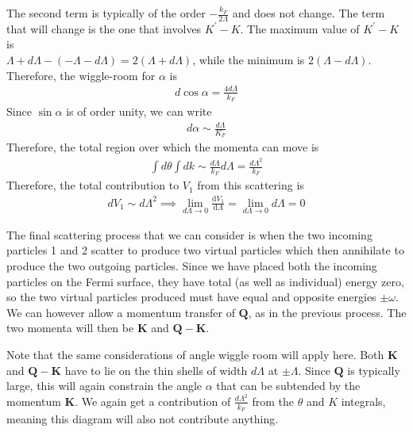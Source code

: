 \documentclass[14pt]{extarticle}
\begin{document}
The second term is typically of the order \(-\frac{k_F}{2\Lambda}\) and does not change. The term that will change is the one that involves \(K^\prime - K\). The maximum value of \(K^\prime - K\) is \\\(\Lambda + d\Lambda  - \left(-\Lambda - d\Lambda\right) = 2\left(\Lambda+d\Lambda\right)\), while the minimum is
\(2\left(\Lambda-d\Lambda\right)\). Therefore, the wiggle-room for \(\alpha\) is
\begin{equation}\begin{aligned}
d\cos \alpha = \frac{4 d\Lambda}{k_F}
\end{aligned}\end{equation}
Since \(\sin \alpha\) is of order unity, we can write
\begin{equation}\begin{aligned}
d\alpha \sim \frac{d\Lambda}{K_F}
\end{aligned}\end{equation}
Therefore, the total region over which the momenta can move is
\begin{equation}\begin{aligned}
\int d\theta \int dk \sim \frac{d\Lambda}{k_F}d\Lambda = \frac{d\Lambda^2}{k_F}
\end{aligned}\end{equation}
Therefore, the total contribution to \(V_1\) from this scattering is
\begin{equation}\begin{aligned}
	d V_1 \sim d\Lambda^2 \implies \lim_{d\Lambda \to 0} \frac{\mathrm{d}V_1}{\mathrm{d}\Lambda} = \lim_{d\Lambda \to 0} d\Lambda = 0
\end{aligned}\end{equation}
\begin{minipage}{280pt}
	The final scattering process that we can consider is when the two incoming particles 1 and 2 scatter to produce two virtual particles which then annihilate to produce the two outgoing particles. Since we have placed both the incoming particles on the Fermi surface, they have total (as well as individual) energy zero, so the two virtual particles produced must have equal and opposite energies \(\pm \omega\). We can however allow a momentum transfer of \(\mathbf{Q}\), as in the previous process. The two momenta will then be \(\mathbf{K}\) and \(\mathbf{Q} -\mathbf{K}\).
 
Note that the same considerations of angle wiggle room will apply here. Both \(\mathbf{K}\) and \(\mathbf{Q-K}\) have to lie on the thin shells of width \(d\Lambda\) at \(\pm \Lambda\). Since \(\mathbf{Q}\) is typically large, this will again constrain the angle \(\alpha\) that can be subtended by the momentum \(\mathbf{K}\). We again get a contribution of \(\frac{d\Lambda^2}{k_F}\) from the \(\theta\) and \(K\) integrals, meaning this diagram will also not contribute anything.\\
\end{minipage}
\end{document}
